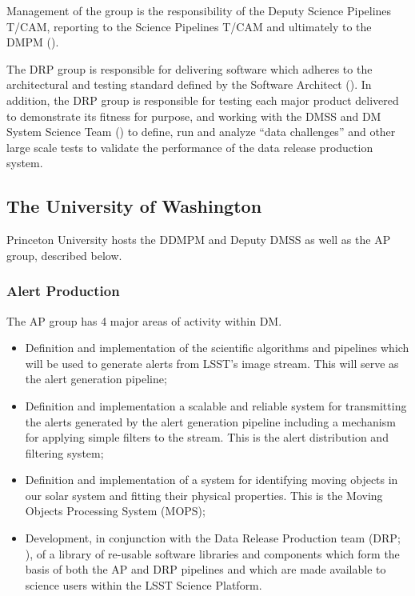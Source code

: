 Management of the group is the responsibility of the Deputy \gls{Science Pipelines} \gls{T/CAM}, reporting to the \gls{Science Pipelines} \gls{T/CAM} and ultimately to the \gls{DMPM} ().

The \gls{DRP} group is responsible for delivering software which adheres to the architectural and testing standard defined by the Software Architect ().
In addition, the \gls{DRP} group is responsible for testing each major product delivered to demonstrate its fitness for purpose, and working with the \gls{DMSS} and \gls{DM} System Science Team () to define, run and analyze ``data challenges'' and other large scale tests to validate the performance of the data release production system.

\subsection {The University of Washington\label{sect:uw}}

Princeton University hosts the \gls{DDMPM} and Deputy \gls{DMSS} as well as the \gls{AP} group, described below.

\subsubsection{Alert Production\label{sect:ap}}

The \gls{AP} group has 4 major areas of activity within \gls{DM}.

\begin{itemize}

  \item{Definition and implementation of the scientific algorithms and pipelines which will be used to generate alerts from \gls{LSST}'s image stream.  This will serve as the alert generation \gls{pipeline};}

  \item{Definition and implementation a scalable and reliable system for transmitting the alerts generated by the alert generation \gls{pipeline} including a mechanism for applying simple filters to the stream. This is the alert distribution and filtering system;}

  \item{Definition and implementation of a system for identifying moving objects in our solar system and fitting their physical properties. This is the Moving Objects Processing System (\gls{MOPS});}

  \item{Development, in conjunction with the Data \gls{Release} Production team (\gls{DRP}; ), of a library of re-usable software libraries and components which form the basis of both the \gls{AP} and \gls{DRP} pipelines and which are made available to science users within the \gls{LSST} \gls{Science Platform}.}

\end{itemize}

